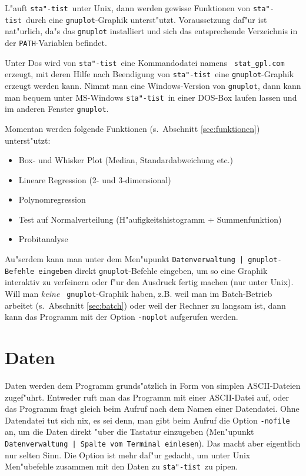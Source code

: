 \documentclass[a4paper,11pt]{article}
\newcommand{\st}{{\tt sta"-tist}}
\begin{document}
L"auft \st\ unter {\sc Unix}, dann werden gewisse Funktionen von \st\
durch eine {\tt gnuplot}-Graphik unterst"utzt. Voraussetzung daf"ur ist
nat"urlich, da"s das {\tt gnuplot} installiert und
sich das entsprechende Verzeichnis in der {\tt PATH}-Variablen
befindet.

Unter {\sc Dos} wird von \st\ eine Kommandodatei namens {\tt
  stat\_gpl.com} erzeugt, mit deren Hilfe nach Beendigung von \st\ 
eine {\tt gnuplot}-Graphik erzeugt werden kann. Nimmt man eine
Windows-Version von {\tt gnuplot}, dann kann man bequem unter
MS-Windows \st\ in einer DOS-Box laufen lassen und im anderen Fenster
  {\tt gnuplot}.

Momentan werden folgende Funktionen (s.\ Abschnitt
\ref{sec:funktionen}) unterst"utzt:
\begin{itemize}
\item {\sc Box- und Whisker} Plot (Median, Standardabweichung etc.)
\item Lineare Regression (2- und 3-dimensional)
\item Polynomregression
\item Test auf Normalverteilung (H"aufigkeitshistogramm + Summenfunktion)
\item Probitanalyse
\end{itemize}
Au"serdem kann man unter dem Men"upunkt {\tt Datenverwaltung |
  gnuplot-Befehle eingeben} direkt {\tt gnuplot}-Befehle eingeben, um so
eine Graphik interaktiv zu verfeinern oder f"ur den Ausdruck fertig
machen (nur unter {\sc Unix}). Will man {\em keine\/} {\tt
  gnuplot}-Graphik haben, z.B. weil man im Batch-Betrieb arbeitet (s.\ 
Abschnitt \ref{sec:batch}) oder weil der Rechner zu langsam ist, dann kann das
Programm mit der Option {\tt -noplot} aufgerufen werden.



\section{Daten}
\label{sec:daten}
Daten werden dem Programm grunds"atzlich in Form von simplen
ASCII-Dateien zugef"uhrt. Entweder ruft man das Programm mit einer
ASCII-Datei auf, oder das Programm fragt gleich beim Aufruf nach dem
Namen einer Datendatei. Ohne Datendatei tut sich nix, es sei denn, man
gibt beim Aufruf die Option {\tt -nofile} an, um die Daten direkt
"uber die Tastatur einzugeben (Men"upunkt {\tt Datenverwaltung |
  Spalte vom Terminal einlesen}). Das macht aber eigentlich nur selten
Sinn. Die Option ist mehr daf"ur gedacht, um unter {\sc Unix}
Men"ubefehle zusammen mit den Daten zu \st\ zu pipen.
\end{document}
